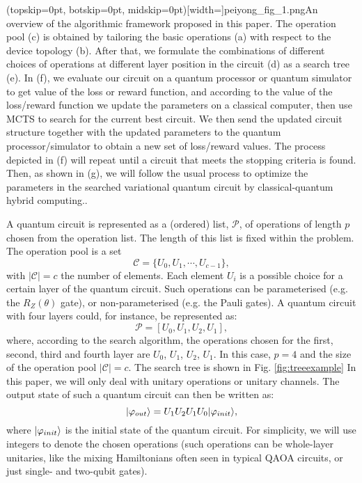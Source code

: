 \documentclass{ieeeaccess}
\begin{document}
\Figure[t!](topskip=0pt, botskip=0pt, midskip=0pt)[width=\textwidth]{peiyong_fig_1.png}{An overview of the algorithmic framework proposed in this paper. The operation pool (c) is obtained by tailoring the basic operations (a) with respect to the device topology (b). After that, we formulate the combinations of different choices of operations at different layer position in the circuit (d) as a search tree (e). In (f), we evaluate our circuit on a quantum processor or quantum simulator to get value of the loss or reward function, and according to the value of the loss/reward function we update the parameters on a classical computer, then use MCTS to search for the current best circuit. We then send the updated circuit structure together with the updated parameters to the quantum processor/simulator to obtain a new set of loss/reward values. The process depicted in (f) will repeat until a circuit that meets the stopping criteria is found. Then, as shown in (g), we will follow the usual process to optimize the parameters in the searched variational quantum circuit by classical-quantum hybrid computing..\label{fig:overview}}

A quantum circuit is represented as a (ordered) list, $\mathcal{P}$, of operations of length $p$ chosen from the operation list. The length of this list is fixed within the problem.
The operation pool is a set 
\begin{equation}
\mathcal{C} = \{U_0, U_1, \cdots, U_{c-1} \},
\end{equation}
with $\vert \mathcal{C} \vert = c$ the number of elements. Each element $U_i$ is a possible choice for a certain layer of the quantum circuit. Such operations can be parameterised (e.g. the $R_Z(\theta)$ gate), or non-parameterised (e.g. the Pauli gates). A quantum circuit with four layers could, for instance, be represented as:
\begin{equation}
    \mathcal{P} = [U_0, U_1, U_2, U_1],
\end{equation}
where, according to the search algorithm, the operations chosen for the first, second, third and fourth layer are $U_0$, $U_1$, $U_2$, $U_1$. In this case, $p=4$ and the size of the operation pool $\vert \mathcal{C} \vert = c$. The search tree is shown in Fig. \ref{fig:treeexample} In this paper, we will only deal with unitary operations or unitary channels. The output state of such a quantum circuit can then be written as:
\begin{equation}
    \vert\varphi_{\rm out}\rangle = U_1 U_2 U_1 U_0 \vert\varphi_{\rm init}\rangle\label{eq:U1U3U1U2},
\end{equation}
where $\vert \varphi_{\rm init}\rangle$ is the initial state of the quantum circuit. For simplicity, we will use integers to denote the chosen operations (such operations can be whole-layer unitaries, like the mixing Hamiltonians often seen in typical QAOA circuits, or just single- and two-qubit gates). 




\typeout{} 




\EOD
\end{document}
